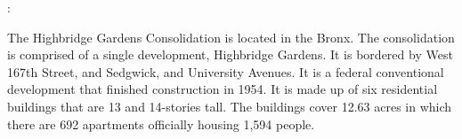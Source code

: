 :   

    

The Highbridge Gardens Consolidation is located in the Bronx. The consolidation is comprised of a single development, Highbridge Gardens. It is bordered by West 167th Street, and Sedgwick, and University Avenues. It is a federal conventional development that finished construction in 1954. It is made up of six residential buildings that are 13 and 14-stories tall. The buildings cover 12.63 acres in which there are 692 apartments officially housing 1,594 people.     